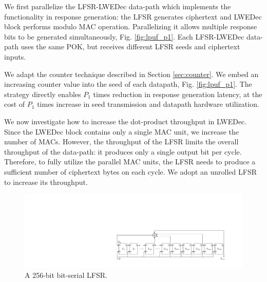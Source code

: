We first parallelize the LFSR-LWEDec data-path which implements the functionality in response generation: the LFSR generates ciphertext and LWEDec block performs modulo MAC operation. 
Parallelizing it allows multiple response bits to be generated simultaneously, Fig. \ref{fig:lpuf_p1}. Each LFSR-LWEDec data-path uses the same POK, but receives different LFSR seeds and ciphertext inputs. 

We adapt the counter technique described in Section \ref{sec:counter}.  
We embed an increasing counter value into the seed of each datapath, Fig. \ref{fig:lpuf_p1}. %
The strategy directly enables $P_1$ times reduction in response generation latency, at the cost of $P_1$ times increase in seed transmission and datapath hardware utilization.

We now investigate how to increase the dot-product throughput in LWEDec. 
Since the LWEDec block contains only a single MAC unit, we increase the number of MACs. However, the throughput of the LFSR limits the overall throughput of the data-path: it produces only a single output bit per cycle. %
Therefore, to fully utilize the parallel MAC units, the LFSR needs to produce a sufficient number of ciphertext bytes on each cycle. We adopt an unrolled LFSR to increase its throughput.

\begin{figure}[t!]
\centering
\includegraphics[width = 1.0\linewidth]{./figs/lfsr_baseline_compressed}
\caption{A 256-bit bit-serial LFSR.}
\label{fig:lfsr_baseline}
\end{figure}

